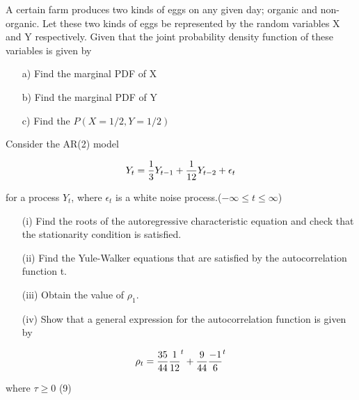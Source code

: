 \documentclass[12pt]{report}
\begin{document}
	
	
	
	A certain farm produces two kinds of eggs on any given day; organic and non-organic. 
	Let these two kinds of eggs be represented by the random variables X and Y respectively. 
	Given that the joint probability density function of these variables is given by
	
	
	\begin{itemize}
		\item[a)] Find the marginal PDF of X
		
		\item[b)] Find the marginal PDF of Y
		
		\item[c)] Find the $P(X = 1/2, Y = 1/2)$
	\end{itemize}


%	
%		






	
	Consider the AR(2) model
	
	
	\[Y_t={1\over 3}Y_{t-1}+{1\over 12}Y_{t-2}+ \epsilon_t\]
	
	for a process $Y_t$, where {$\epsilon_t$} is a white noise process.($-\infty \leq t \leq \infty$)
	
	\begin{itemize}
		\item[(i)] Find the roots of the autoregressive characteristic equation and check that the stationarity condition is satisfied.
		
		\item[(ii)] Find the Yule-Walker equations that are satisfied by the autocorrelation function t.
		
		\item[(iii)] Obtain the value of $\rho_1$.

		\item[(iv)] Show that a general expression for the autocorrelation function is given by
	\end{itemize}
	\[\rho_t={35\over 44}{1\over 12}^t +{9\over 44}{-1\over 6}^t
	\]
	
	where $\tau \geq 0$     (9)
\end{document}
